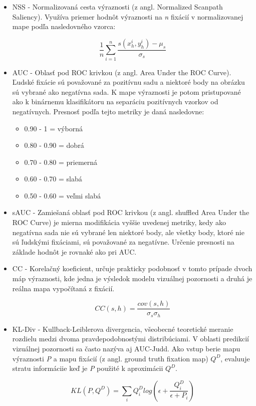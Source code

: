 \begin{itemize}
	
	\item NSS - Normalizovaná cesta výraznosti (z angl. Normalized Scanpath Saliency). Využíva priemer hodnôt výraznosti na \textit{n} fixácií v normalizovanej mape podľa nasledovného vzorca: 
	
	\begin{equation}
	\frac{1}{n} \sum_{i=1}^{n} \frac{s(x_{h}^{i}, y_{h}^{i}) - \mu_{s}}{\sigma _{s}}
	\end{equation}
	
	\item AUC - Oblasť pod ROC krivkou (z angl. Area Under the ROC Curve).
	Ľudské fixácie sú považované za pozitívnu sadu a niektoré body na obrázku sú vybrané ako negatívna sada. K mape výraznosti je potom pristupované ako k binárnemu klasifikátoru na separáciu pozitívnych vzorkov od negatívnych. Presnosť podľa tejto metriky je daná nasledovne: 
	
	\begin{itemize}
		
		\item 0.90 - 1 = výborná
		\item 0.80 - 0.90 = dobrá
		\item 0.70 - 0.80 = priemerná
		\item 0.60 - 0.70 = slabá
		\item 0.50 - 0.60 = veľmi slabá
		
	\end{itemize}
	
	\item sAUC - Zamiešaná oblasť pod ROC krivkou (z angl. shuffled Area Under the ROC Curve) je mierna modifikácia vyššie uvedenej metriky, kedy ako negatívna sada nie sú vybrané len niektoré body, ale všetky body, ktoré nie sú ľudskými fixáciami, sú považované za negatívne. Určenie presnosti na základe hodnôt je rovnaké ako pri AUC. 
	
	\item CC - Korelačný koeficient, určuje prakticky podobnosť v tomto prípade dvoch máp výraznosti, kde jedna je výsledok modelu vizuálnej pozornosti a druhá je reálna mapa vypočítaná z fixácií. 
	
	\begin{equation}
	CC (s, h) = \frac{cov(s, h)}{\sigma_{s} \sigma _{h}}
	\end{equation}
	
	\item KL-Div - Kullback-Leiblerova divergencia\cite{bylinskii2016different}, všeobecné teoretické meranie rozdielu medzi dvoma pravdepodobnostými distribúciami. V oblasti predikcií vizuálnej pozornosti sa často nazýva aj AUC-Judd. Ako vstup berie mapu výraznosti \textit{P} a mapu fixácií (z angl.  ground  truth  fixation map) \textit{$Q^{D}$}, evaluuje stratu informáciie keď je \textit{P} použité k aproximácii \textit{$Q^{D}$}.
	
	\begin{equation}
		KL (P, Q^D) =  \sum_{i} Q_{i}^{D} log \left ( \epsilon + \frac{Q_{i}^{D}}{\epsilon + P_i} \right )
	\end{equation}
	
\end{itemize}
 
